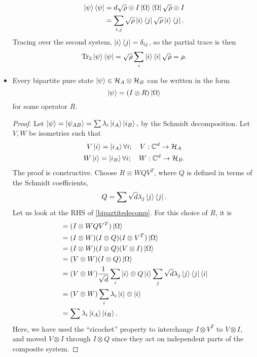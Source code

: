 \begin{itemize}
\begin{align*}
        \left| \psi \right>\left< \psi \right|&=d\sqrt{\rho} \otimes I \left| \Omega \right>\left< \Omega \right| \sqrt{\rho}\otimes I\\
            &= \sum_{i,j}\sqrt{\rho}\left| i \right>\left< j \right|\sqrt{\rho} \left| i \right>\left< j \right|.
    \end{align*}
    Tracing over the second system, $\left| i \right>\left< j \right|=\delta_{ij}$, so the partial trace is then
    \begin{equation}
        \operatorname{Tr}_2 \left| \psi \right>\left< \psi \right| = \sqrt{\rho} \sum_i \left| i \right>\left< i \right| \sqrt{\rho} = \rho.
    \end{equation}
    \item Every bipartite pure state $\left| \psi \right>\in \mathcal H_A \otimes \mathcal H_B$ can be written in the form
    \begin{equation}\label{bipartitedecomp}
        \left| \psi \right>=(I\otimes R) \left| \Omega \right>
    \end{equation}
    for some operator $R$.
    \begin{proof}
        Let $\left| \psi \right>=\left| \psi_{AB} \right>=\sum \lambda_i \left| i_A \right>\left| i_B \right>,$ by the Schmidt decomposition. Let $V,W$ be isometries such that
        \begin{gather}
            V\left| i \right>=\left| i_A \right>\forall i ; \quad V:\mathbb{C}^d \to \mathcal H_A\\
            W\left| i \right>=\left| i_B \right>\forall i; \quad W:\mathbb{C}^d \to \mathcal H_B.
        \end{gather}
        The proof is constructive. Choose $R \equiv W Q V^T$, where $Q$ is defined in terms of the Schmidt coefficients,
        \begin{equation}
            Q=\sum \sqrt{d} \lambda_j \left| j \right>\left< j \right|.
        \end{equation}
        Let us look at the RHS of \ref{bipartitedecomp}. For this choice of $R$, it is
        \begin{align*}
            &=(I\otimes WQV^T) \left| \Omega \right>\\
            &=(I\otimes W)(I\otimes Q)(I\otimes V^T)\left| \Omega \right>\\
            &=(I\otimes W)(I\otimes Q)(V\otimes I)\left| \Omega \right>\\
            &= (V\otimes W)(I\otimes Q) \left| \Omega \right>\\
            &= (V\otimes W) \frac{1}{\sqrt{d}} \sum_i \left|  i \right>\otimes Q\left| i \right> \sum_j \sqrt{d} \lambda_j \left| j \right>\left< j \right|\left< i \right|\\
            &=(V\otimes W) \sum_i \lambda_i \left| i \right>\otimes \left| i \right>\\
            &= \sum \lambda_i \left| i_A \right> \left| i_B \right>.\qedhere
        \end{align*}
        Here, we have used the ``ricochet'' property to interchange $I\otimes V^T$ to $V\otimes I$, and moved $V\otimes I$ through $I\otimes Q$ since they act on independent parts of the composite system.
    \end{proof}
\end{itemize}

